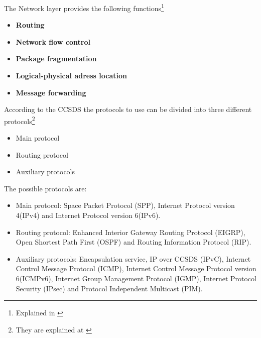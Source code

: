 The Network layer provides the following functions\footnote{Explained in \cite[Chapter 1, Section 2]{annex3}}

\begin{itemize}
\item \textbf{Routing}
\item \textbf{Network flow control}
\item \textbf{Package fragmentation}
\item \textbf{Logical-physical adress location}
\item \textbf{Message forwarding}
\end{itemize}

According to the CCSDS the protocols to use can be divided into three different protocols\footnote{They are explained at \cite[Chapter 1, Section 2]{annex3}} 

\begin{itemize}
\item Main protocol
\item Routing protocol
\item Auxiliary protocols
\end{itemize}

The possible protocols are:

\begin{itemize}
\item Main protocol: Space Packet Protocol (SPP), Internet Protocol version 4(IPv4) and Internet Protocol version 6(IPv6).
\item Routing protocol: Enhanced Interior Gateway Routing Protocol (EIGRP), Open Shortest Path First (OSPF) and Routing Information Protocol (RIP).
\item Auxiliary protocols: Encapsulation service, IP over CCSDS (IPvC), Internet Control Message Protocol (ICMP), Internet Control Message Protocol version 6(ICMPv6), Internet Group Management Protocol (IGMP), Internet Protocol Security (IPsec) and Protocol Independent Multicast (PIM).
\end{itemize}

